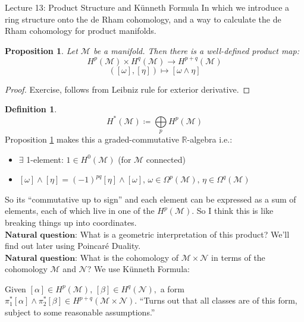 \documentclass[10pt]{article}
\theoremstyle{plain}
\newtheorem{prop}[thm]{Proposition}
\theoremstyle{definition}
\newtheorem{defn}[thm]{Definition} %
\newcommand{\Real}{\mathbb{R}}
\newcommand{\man}{\mathcal{M}}
\newcommand{\nan}{\mathcal{N}}
\newcommand{\pformman}[1]{\Omega^{#1}(\man)}
\newcommand{\cohomman}[1]{H^{#1}(\man)}
\newcommand{\cohomnan}[1]{H^{#1}(\nan)}
\newcommand{\cohom}[2]{H^{#1}(#2)}
\begin{document}
\begin{section}{Lecture 13: Product Structure and K\"unneth Formula}
In which we introduce a ring structure onto the de Rham cohomology, and a way to calculate the de Rham cohomology for product manifolds.
\begin{prop}\label{prop:productmapwelldefined}
Let $\man $ be a manifold. Then there is a well-defined product map:
$$\cohomman{p} \times \cohomman{q} \to \cohomman{p+q}$$
$$([\omega],[\eta]) \mapsto [\omega \wedge \eta]$$
\end{prop}
\begin{proof}
Exercise, follows from Leibniz rule for exterior derivative.
\end{proof}
\begin{defn}
$$\cohomman{*} \coloneqq \bigoplus\limits_{p} \cohomman{p}$$
Proposition \ref{prop:productmapwelldefined} makes this a graded-commutative $\Real$-algebra i.e.:\begin{itemize}
    \item $\exists$ 1-element: $1\in \cohomman{0} $ (for $\man$ connected)
    \item  $[\omega] \wedge [ \eta] = (-1)^{pq} [\eta]\wedge[\omega] , \, \omega \in \pformman{p}, \, \eta \in \pformman{q}$
\end{itemize}
\end{defn}
So its ``commutative up to sign'' and each element can be expressed as a sum of elements, each of which live in one of the $\cohomman{p}$. So I think this is like breaking things up into coordinates.\\
$\textbf{Natural question:}$ What is a geometric interpretation of this product? We'll find out later using Poincar\'e Duality.\\
$\textbf{Natural question:}$ What is the cohomology of $\man \times \nan $ in terms of the cohomology $\man$ and $\nan$? We use K\"unneth Formula: \\
Given $[\alpha] \in \cohomman{p}, \, [\beta] \in \cohomnan{q},$ a form $\pi_1^*[\alpha]\wedge \pi_2^*[\beta] \in \cohom{p+q}{\man \times \nan}$. ``Turns out that all classes are of this form, subject to some reasonable assumptions.''

\end{section}
\end{document}
